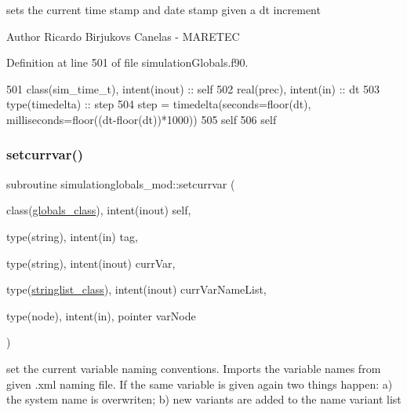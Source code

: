 sets the current time stamp and date stamp given a dt increment 

\begin{DoxyAuthor}{Author}
Ricardo Birjukovs Canelas -\/ M\+A\+R\+E\+T\+EC 
\end{DoxyAuthor}


Definition at line 501 of file simulation\+Globals.\+f90.


\begin{DoxyCode}
501     \textcolor{keywordtype}{class}(sim\_time\_t), \textcolor{keywordtype}{intent(inout)} :: self
502     \textcolor{keywordtype}{real(prec)}, \textcolor{keywordtype}{intent(in)} :: dt
503     \textcolor{keywordtype}{type}(timedelta) :: step
504     step = timedelta(seconds=floor(dt), milliseconds=floor((dt-floor(dt))*1000))
505     self%
506     self%
\end{DoxyCode}
\mbox{\label{namespacesimulationglobals__mod_a4dd64cb7a896b62d90e20a7eab65a6bf}} 
\subsubsection{\texorpdfstring{setcurrvar()}{setcurrvar()}}
{\footnotesize\ttfamily subroutine simulationglobals\+\_\+mod\+::setcurrvar (\begin{DoxyParamCaption}\item[{class(\mbox{\hyperlink{structsimulationglobals__mod_1_1globals__class}{globals\+\_\+class}}), intent(inout)}]{self,  }\item[{type(string), intent(in)}]{tag,  }\item[{type(string), intent(inout)}]{curr\+Var,  }\item[{type(\mbox{\hyperlink{structsimulationglobals__mod_1_1stringlist__class}{stringlist\+\_\+class}}), intent(inout)}]{curr\+Var\+Name\+List,  }\item[{type(node), intent(in), pointer}]{var\+Node }\end{DoxyParamCaption})\hspace{0.3cm}{\ttfamily [private]}}



set the current variable naming conventions. Imports the variable names from given .xml naming file. If the same variable is given again two things happen\+: a) the system name is overwriten; b) new variants are added to the name variant list 

